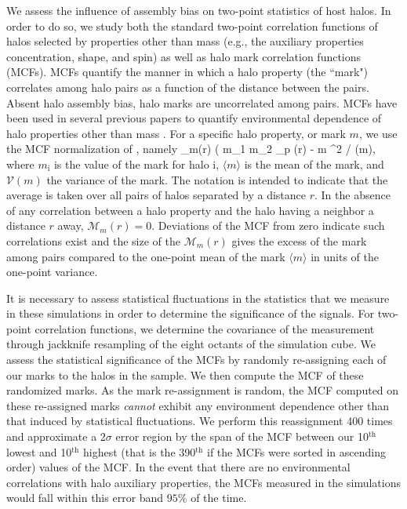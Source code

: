 \documentclass[usenatbib,usegraphicx,letterpaper]{mn2e}
\begin{document}
We assess the influence of assembly bias on two-point statistics of host halos. In order to do so, we 
study both the standard two-point correlation functions of halos selected by properties other than mass 
(e.g., the auxiliary properties concentration, shape, and spin) as well as halo mark correlation functions
(MCFs). MCFs quantify the manner in which a halo property (the ``mark") correlates among halo pairs as a function
of the distance between the pairs. Absent halo assembly bias, halo marks are uncorrelated among pairs. 
MCFs have been used in several previous papers to quantify environmental dependence of halo 
properties other than mass \citep{sheth04, harker06, wechsler06, mao15} . 
For a specific halo property, or mark $m$, we use the MCF normalization of \citet{wechsler06}, namely 
\beq
{}_m(r) \equiv ( \langle m_1 m_2 \rangle_p (r) - \langle m \rangle^2 / (m),
\eeq
where $m_{\mathrm{i}}$ is the value of the mark for halo $\mathrm{i}$, $\langle m \rangle$ is the mean of the
mark, and $\mathcal{V}(m)$ the variance of the mark. The notation is intended to indicate that the average is
taken over all pairs of halos separated by a distance $r$. In the absence of any correlation between a halo
property and the halo having a neighbor a distance $r$ away, $\mathcal{M}_m(r) = 0$. Deviations of the MCF from
zero indicate such correlations exist and the size of the $\mathcal{M}_m(r)$ gives the excess of the mark among
pairs compared to the one-point mean of the mark $\langle m\rangle$ in units of the one-point variance.


It is necessary to assess statistical fluctuations in the statistics that we measure in these simulations in
order to determine the significance of the signals. For two-point correlation functions, we determine the
covariance of the measurement through jackknife resampling of the eight octants of the simulation cube. We assess
the statistical significance of the MCFs by randomly re-assigning each of our marks to the halos in the sample. 
We then compute the MCF of these randomized marks. As the mark re-assignment is random, 
the MCF computed on these re-assigned marks {\em cannot} exhibit any 
environment dependence other than that induced by statistical fluctuations. 
We perform this reassignment 400 times and approximate a $2\sigma$ error region by 
the span of the MCF between our 10$^\mathrm{th}$ lowest and 10$^\mathrm{th}$ highest (that is the
390$^\mathrm{th}$ if the MCFs were sorted in ascending order) values of the MCF. In the event that there are no
environmental correlations with halo auxiliary properties, the MCFs measured in the simulations would fall within
this error band $95\%$ of the time. 
\end{document}
